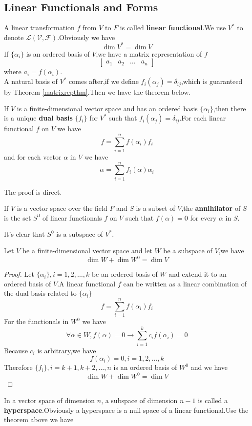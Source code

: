 \documentclass{article}
\begin{document}
\subsection{Linear Functionals and Forms}
A linear transformation $f$ from $V$ to $F$ is called \textbf{linear functional}.We use $V^*$ to denote $\mathcal{L(V,F)}$.Obviously we have
\[\dim V^*=\dim V\]
If $\{\alpha_i\}$ is an ordered basis of $V$,we have a matrix representation of $f$
\[\begin{bmatrix}
	a_1&a_2&\dots&a_n
\end{bmatrix}\]
where $a_i=f(\alpha_i)$.\\
\indent A natural basis of $ V^*$ comes after,if we define $f_i(\alpha_j)=\delta_{ij}$,which is guaranteed by Theorem \ref{matrixrepthm}.Then we have the theorem below.
\begin{thm}
	If $V$ is a finite-dimensional vector space and has an ordered basis $\{\alpha_i\}$,then there is a unique \textbf{dual basis} $\{f_i\}$ for $V^*$ such that $f_i(\alpha_j)=\delta_{ij}$.For each linear functional $f$ on $V$ we have
	\[f=\sum\limits_{i=1}^nf(\alpha_i)f_i\]
	and for each vector $\alpha$ in $V$ we have
	\[\alpha=\sum\limits_{i=1}^nf_i(\alpha)\alpha_i\]
\end{thm}
The proof is direct.
\begin{dde}
	If $V$ is a vector space over the field $F$ and $S$ is a subset of $V$,the \textbf{annihilator} of $S$ is the set $S^0$ of linear functionals $f$ on $V$ such that $f(\alpha)=0$ for every $\alpha$ in $S$.
\end{dde}
It's clear that $S^0$ is a subspace of $V^*$.
\begin{thm}\label{dimfunc}
	Let $V$ be a finite-dimensional vector space and let $W$ be a subspace of $V$,we have
	\[\dim W+\dim W^0=\dim V\]
\end{thm}
\begin{proof}
	Let $\{\alpha_i\},i=1,2,\dots,k$ be an ordered basis of $W$ and extend it to an ordered basis of $V$.A linear functional $f$ can be written as a linear combination of the dual basis related to $\{\alpha_i\}$
	\[f=\sum\limits_{i=1}^nf(\alpha_i)f_i\]
	For the functionals in $W^0$ we have
	\[\forall \alpha \in W,f(\alpha)=0\rightarrow\sum\limits_{i=1}^kc_if(\alpha_i)=0\]
	Because $c_i$ is arbitrary,we have
	\[f(\alpha_i)=0,i=1,2,\dots,k\]
	Therefore $\{f_i\},i=k+1,k+2,\dots,n$ is an ordered basis of $W^0$ and we have
	\[\dim W+\dim W^0=\dim V\]
\end{proof}
In a vector space of dimension $n$, a subspace of dimension $n-1$ is called a \textbf{hyperspace}.Obviously a hyperspace is a null space of a linear functional.Use the theorem above we have
\end{document}
